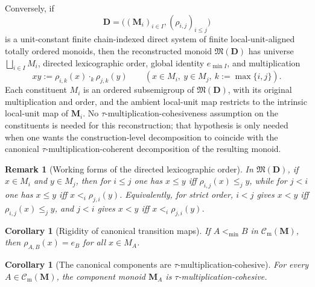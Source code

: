 \documentclass[pdflatex,sn-mathphys-num]{sn-jnl}
\theoremstyle{thmstyleone}%
\newtheorem{corollary}[theorem]{Corollary}
\theoremstyle{thmstyletwo}%
\newtheorem{remark}[theorem]{Remark}
\theoremstyle{thmstylethree}%
\newcommand{\Cm}{\mathcal C_{\mathrm m}}
\begin{document}
Conversely, if
\[
\mathbf D=\bigl((\mathbf M_i)_{i\in I},(\rho_{i,j})_{i\le j}\bigr)
\]
is a unit-constant finite chain-indexed direct system of finite local-unit-aligned totally ordered monoids, then the reconstructed monoid \(\mathfrak M(\mathbf D)\) has universe \(\bigsqcup_{i\in I}M_i\), directed lexicographic order, global identity \(e_{\min I}\), and multiplication
\[
xy:=\rho_{i,k}(x)\cdot_k\rho_{j,k}(y)
\qquad
(x\in M_i,\ y\in M_j,\ k:=\max\{i,j\}).
\]
Each constituent \(M_i\) is an ordered subsemigroup of \(\mathfrak M(\mathbf D)\), with its original multiplication and order, and the ambient local-unit map restricts to the intrinsic local-unit map of \(\mathbf M_i\).
No \(\tau\)-multiplication-cohesiveness assumption on the constituents is needed for this reconstruction; that hypothesis is only needed when one wants the construction-level decomposition to coincide with the canonical \(\tau\)-multiplication-coherent decomposition of the resulting monoid.

\begin{remark}[Working forms of the directed lexicographic order]\label{rem:directed-lex-order-working-forms}
In \(\mathfrak M(\mathbf D)\), if \(x\in M_i\) and \(y\in M_j\), then for \(i\le j\) one has \(x\le y\) iff \(\rho_{i,j}(x)\le_j y\), while for \(j<i\) one has \(x\le y\) iff \(x<_i\rho_{j,i}(y)\).
Equivalently, for strict order, \(i<j\) gives \(x<y\) iff \(\rho_{i,j}(x)\le_j y\), and \(j<i\) gives \(x<y\) iff \(x<_i\rho_{j,i}(y)\).
\end{remark}

\begin{corollary}[Rigidity of canonical transition maps]\label{cor:canonical-transition-maps-unit-constant}
If \(A<_{\min}B\) in \(\Cm(\mathbf M)\), then \(\rho_{A,B}(x)=e_B\) for all \(x\in M_A\).
\end{corollary}

\begin{corollary}[The canonical components are \(\tau\)-multiplication-cohesive]\label{cor:canonical-components-already-terminal-direct}
For every \(A\in\Cm(\mathbf M)\), the component monoid \(\mathbf M_A\) is \(\tau\)-multiplication-cohesive.
\end{corollary}
\end{document}
